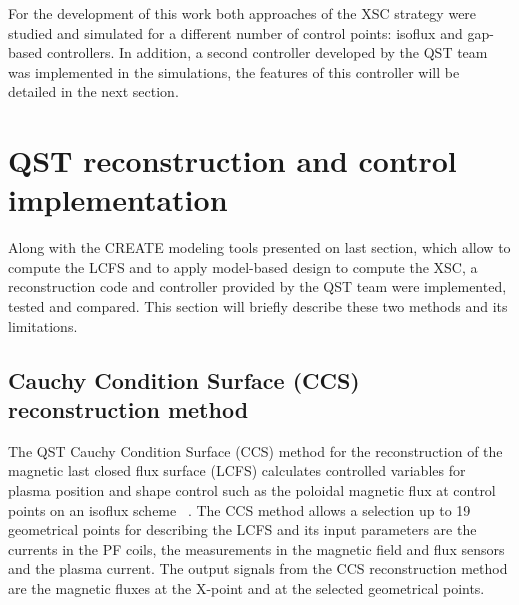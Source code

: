 For the development of this work both approaches of the XSC strategy were studied and simulated for a different number of control points: isoflux and gap-based controllers. In addition, a second controller developed by the QST team was implemented in the simulations, the features of this controller will be detailed in the next section.



\section{QST reconstruction and control implementation}
Along with the CREATE modeling tools presented on last section, which allow to compute the LCFS and to apply model-based design to compute the XSC, a reconstruction code and controller provided by the QST team were implemented, tested and compared. This section will briefly describe these two methods and its limitations.  

\subsection{Cauchy Condition Surface (CCS) reconstruction  method }
The QST Cauchy Condition Surface (CCS) method for the reconstruction of the magnetic last closed flux surface (LCFS) calculates controlled variables for plasma position and shape control such as the poloidal magnetic flux at control points on an isoflux scheme  ~\cite{CCS}. The CCS method allows a selection up to 19 geometrical points for describing the LCFS and its input parameters are the currents in the PF coils, the measurements in the magnetic field and flux sensors and the plasma current. The output signals from the CCS reconstruction method are the magnetic fluxes at the X-point and at the selected geometrical points. 

